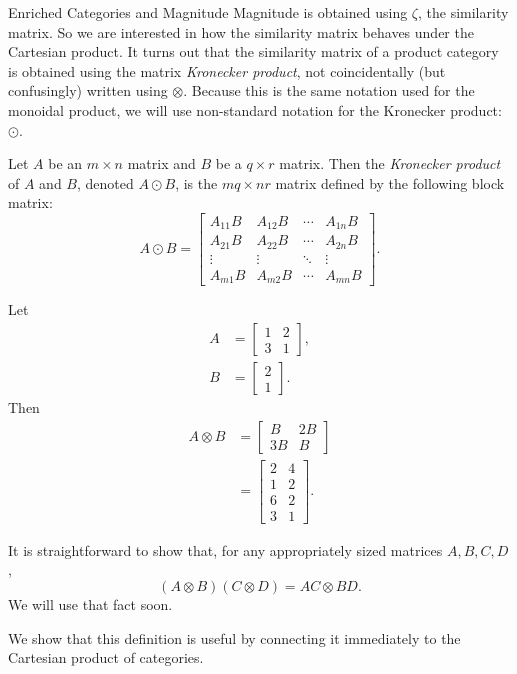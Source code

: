 \documentclass[12pt]{pom_thesis}
\newcommand{\kron}{\odot}
\begin{document}
\begin{chapter}{Enriched Categories and Magnitude}
Magnitude is obtained using $\zeta$, the similarity matrix. So we are interested in how the similarity matrix behaves under the Cartesian product. It turns out that the similarity matrix of a product category is obtained using the matrix \emph{Kronecker product}, not coincidentally (but confusingly) written using $\otimes$. Because this is the same notation used for the monoidal product, we will use non-standard notation for the Kronecker product: $\kron$.
\begin{defn}
Let $A$ be an $m \times n$ matrix and $B$ be a $q \times r$ matrix. Then the \emph{Kronecker product} of $A$ and $B$, denoted $A \kron B$, is the $mq \times nr$ matrix defined by the following block matrix:
\[
A \kron B = 
\begin{bmatrix}
A_{11}B & A_{12}B & \cdots & A_{1n}B \\
A_{21}B & A_{22}B & \cdots & A_{2n}B \\
\vdots & \vdots & \ddots & \vdots \\
A_{m1}B & A_{m2}B & \cdots & A_{mn}B
\end{bmatrix}.
\]
\end{defn}
\begin{examp}
Let 
\begin{align*}
A &= \begin{bmatrix}
1 & 2 \\
3 & 1
\end{bmatrix},\\
B &= \begin{bmatrix}
2  \\
1 
\end{bmatrix}.
\end{align*}
Then
\begin{align*}
A \otimes B &= 
\begin{bmatrix}
B & 2B\\
3B & B
\end{bmatrix}\\
&= \begin{bmatrix}
2 & 4 \\
1 & 2 \\
6 & 2\\
3 & 1
\end{bmatrix}.
\end{align*}
\end{examp}
\begin{rmk}\label{kron_prod}
It is straightforward to show that, for any appropriately sized matrices $A, B, C, D$,
\[
(A \otimes B) (C \otimes D) = AC \otimes BD.
\]
We will use that fact soon.
\end{rmk}
We show that this definition is useful by connecting it immediately to the Cartesian product of categories.


\end{chapter}
\end{document}
